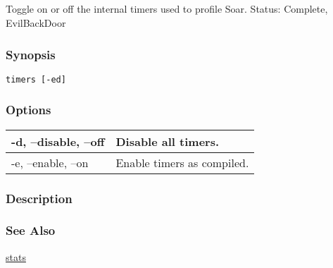 \subsection{}
\label{timers}
Toggle on or off the internal timers used to profile Soar. 
 Status: Complete, EvilBackDoor
\subsubsection*{Synopsis}
\begin{verbatim}
timers [-ed]
\end{verbatim}
\subsubsection*{Options}
\begin{tabular}{|l|l|}
\hline 
 -d, --disable, --off  & Disable all timers.  \\
 \hline 
 -e, --enable, --on  & Enable timers as compiled.  \\
 \hline 
\end{tabular}
\subsubsection*{Description}
\subsubsection*{See Also}
\hyperref[stats]{stats} 